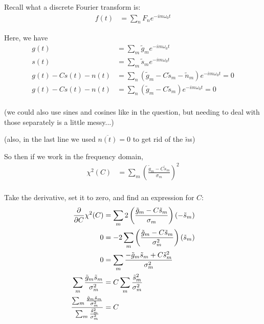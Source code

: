 \begin{enumerate}[label=\textbf{\Alph*}.]
    Recall what a discrete Fourier transform is:
    \begin{align*}
        f(t) &= \sum_n F_n e^{-im\omega_0 t}
    \end{align*}

    Here, we have
    \begin{align*}
        g(t) &= \sum_m \tilde{g}_m e^{-im\omega_0 t} \\
        s(t) &= \sum_m \tilde{s}_m e^{-im\omega_0 t} \\
        g(t) - Cs(t) - n(t) &= \sum_n (\tilde{g}_m - C\tilde{s}_m - \tilde{n}_m) e^{-im\omega_0 t} = 0 \\
        g(t) - Cs(t) - n(t) &= \sum_n (\tilde{g}_m - C\tilde{s}_m) e^{-im\omega_0 t} = 0 \\
    \end{align*}

    (we could also use sines and cosines like in the question, but needing to deal with those separately is a little messy...)

    (also, in the last line we used $\overline{n(t)} = 0$ to get rid of the $\tilde{n}$s)

    So then if we work in the frequency domain,
    \begin{align*}
        \chi^2(C) &= \sum_{m} \left(\frac{\tilde{g}_m - C\tilde{s}_m}{\sigma_m}\right)^2 \\
    \end{align*}

    Take the derivative, set it to zero, and find an expression for $C$:
    \begin{align*}
        \frac{\partial}{\partial C}\chi^2(C) &= \sum_{m} 2\left(\frac{\tilde{g}_m - C\tilde{s}_m}{\sigma_m}\right)(-\tilde{s}_m) \\
        0 &= -2\sum_{m}\left(\frac{\tilde{g}_m - C\tilde{s}_m}{\sigma_m^2}\right)(\tilde{s}_m) \\
        0 &= \sum_{m} \frac{-\tilde{g}_m\tilde{s}_m + C\tilde{s}_m^2}{\sigma_m^2} \\
        \sum_{m} \frac{\tilde{g}_m\tilde{s}_m}{\sigma_m^2} &= C\sum_{m} \frac{\tilde{s}_m^2}{\sigma_m^2} \\
        \frac{\sum_{m} \frac{\tilde{g}_m\tilde{s}_m}{\sigma_m^2}}{\sum_{m} \frac{\tilde{s}_m^2}{\sigma_m^2}} &= C \\
    \end{align*}

\end{enumerate}
